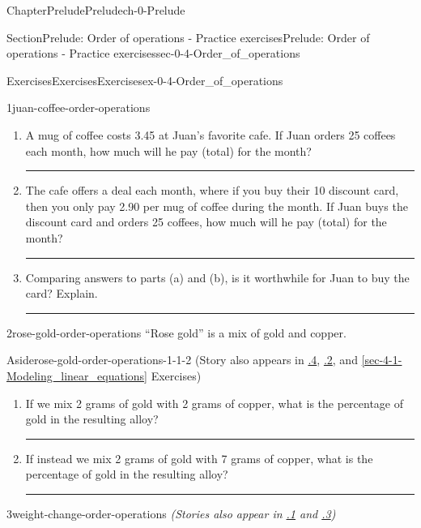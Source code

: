 \documentclass[twoside,11pt,]{book}
\newcommand{\xreffont}{\relax}
\newlength{\workspacestrutwidth}
\numberwithin{equation}{section}
\begin{document}
\begin{chapterptx}{Chapter}{Prelude}{}{Prelude}{}{}{ch-0-Prelude}
\begin{sectionptx}{Section}{Prelude: Order of operations - Practice exercises}{}{Prelude: Order of operations - Practice exercises}{}{}{sec-0-4-Order_of_operations}
\begin{exercises-subsection-numberless}{Exercises}{Exercises}{}{Exercises}{}{}{ex-0-4-Order_of_operations}
\begin{divisionexercise}{1}{}{}{juan-coffee-order-operations}
\begin{enumerate}[label=(\alph*),ref=\alph*]%
\item{}A mug of coffee costs \textdollar{}3.45 at Juan's favorite cafe. If Juan orders 25 coffees each month, how much will he pay (total) for the month?%
\par\rule{\workspacestrutwidth}{0.75in}%
\item{}The cafe offers a deal each month, where if you buy their \textdollar{}10 discount card, then you only pay \textdollar{}2.90 per mug of coffee during the month. If Juan buys the discount card and orders 25 coffees, how much will he pay (total) for the month?%
\par\rule{\workspacestrutwidth}{0.75in}%
\item{}Comparing answers to parts (a) and (b), is it worthwhile for Juan to buy the card? Explain.%
\par\rule{\workspacestrutwidth}{0.75in}%
\end{enumerate}%
\end{divisionexercise}%
 \begin{divisionexercise}{2}{}{}{rose-gold-order-operations}%
``Rose gold'' is a mix of gold and copper. \begin{aside}{Aside}{}{rose-gold-order-operations-1-1-2}%
(Story also appears in \hyperlink{rose-gold-algebraic-notation}{{\xreffont 0.7.4}}, \hyperlink{rose-gold-using-equations}{{\xreffont 2.3.2}}, and \hyperref[sec-4-1-Modeling_linear_equations]{{\xreffont\ref{sec-4-1-Modeling_linear_equations}}} Exercises)%
\end{aside}
%
\begin{enumerate}[label=(\alph*),ref=\alph*]%
\item{}If we mix 2 grams of gold with 2 grams of copper, what is the percentage of gold in the resulting alloy?%
\par\rule{\workspacestrutwidth}{0.75in}%
\item{}If instead we mix 2 grams of gold with 7 grams of copper, what is the percentage of gold in the resulting alloy?%
\par\rule{\workspacestrutwidth}{0in}%
\end{enumerate}%
\end{divisionexercise}%
\clearpage
\begin{divisionexercise}{3}{}{}{weight-change-order-operations}%
\emph{(Stories also appear in \hyperlink{weight-change-algebraic-notation}{{\xreffont 0.7.1}} and \hyperlink{weight-change-intercepts}{{\xreffont 4.3.3}})}%
\begin{enumerate}[label=(\alph*),ref=\alph*]%

\end{enumerate}
\end{divisionexercise}
\end{exercises-subsection-numberless}
\end{sectionptx}
\end{chapterptx}
\end{document}
